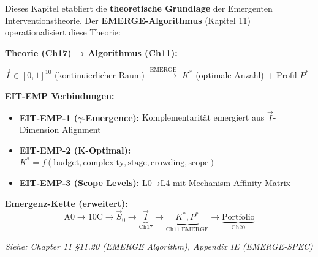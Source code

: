 \begin{tcolorbox}[colback=blue!5!white, colframe=blue!75!black,
    title=\textbf{Cross-Reference: EMERGE Algorithm (Chapter 11, EIT-EMP)}]

Dieses Kapitel etabliert die \textbf{theoretische Grundlage} der Emergenten Interventionstheorie. Der \textbf{EMERGE-Algorithmus} (Kapitel 11) operationalisiert diese Theorie:

\vspace{0.2cm}
\textbf{Theorie (Ch17) → Algorithmus (Ch11):}
\begin{center}
\small
$\vec{I} \in [0,1]^{10}$ (kontinuierlicher Raum) $\xrightarrow{\text{EMERGE}}$ $K^*$ (optimale Anzahl) + Profil $P^*$
\end{center}

\textbf{EIT-EMP Verbindungen:}
\begin{itemize}[nosep]
\item \textbf{EIT-EMP-1 ($\gamma$-Emergence):} Komplementarität emergiert aus $\vec{I}$-Dimension Alignment
\item \textbf{EIT-EMP-2 (K-Optimal):} $K^* = f(\text{budget}, \text{complexity}, \text{stage}, \text{crowding}, \text{scope})$
\item \textbf{EIT-EMP-3 (Scope Levels):} L0→L4 mit Mechanism-Affinity Matrix
\end{itemize}

\vspace{0.2cm}
\textbf{Emergenz-Kette (erweitert):}
\begin{equation*}
\text{A0} \to \text{10C} \to \vec{S}_0 \to \underbrace{\vec{I}}_{\text{Ch17}} \to \underbrace{K^*, P^*}_{\text{Ch11 EMERGE}} \to \underbrace{\text{Portfolio}}_{\text{Ch20}}
\end{equation*}

\vspace{0.2cm}
\textit{Siehe: Chapter 11 §11.20 (EMERGE Algorithm), Appendix IE (EMERGE-SPEC)}
\end{tcolorbox}

